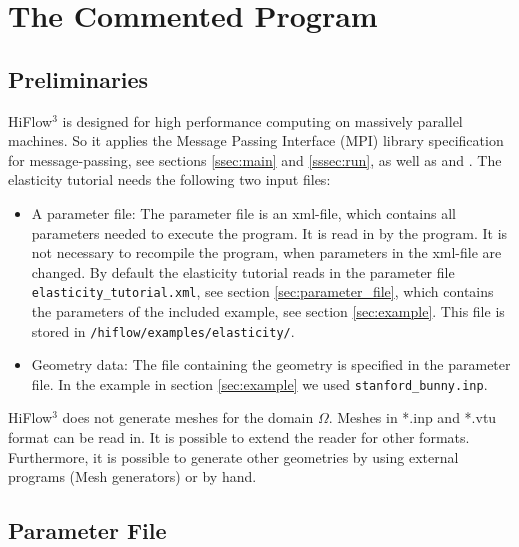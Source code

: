 \documentclass[a4paper, 11pt, twoside]{article}
\theoremstyle{plain}
\theoremstyle{definition}
\begin{document}
\section{The Commented Program}

\subsection{Preliminaries}

HiFlow$^3$ is designed for high performance computing on massively parallel machines. 
So it applies the Message Passing Interface (MPI) library specification for message-passing, see sections \ref{ssec:main} and \ref{sssec:run}, as well as \cite{MPI} and \cite{MPIstandard} .
The elasticity tutorial needs the following two input files:
\begin{itemize}
\item A parameter file: 
The parameter file is an xml-file, which contains all parameters needed to execute the program. 
It is read in by the program. 
It is not necessary to recompile the program, when parameters in the xml-file are changed. 
By default the elasticity tutorial reads in the parameter file \texttt{elasticity\_tutorial.xml}, see section \ref{sec:parameter_file}, which contains the parameters of the included example, see section \ref{sec:example}.
This file is stored in \verb'/hiflow/examples/elasticity/'.  

\item Geometry data: 
The file containing the geometry is specified in the parameter file. 
In the example in section \ref{sec:example} we used \verb'stanford_bunny.inp'.
\end{itemize}
HiFlow$^3$ does not generate meshes for the domain $\Omega$. Meshes in *.inp and *.vtu format can be read in. 
It is possible to extend the reader for other formats.
Furthermore, it is possible to generate other geometries by using external programs (Mesh generators) or by hand.








\subsection{Parameter File}
\label{sec:parameter_file}
\end{document}
